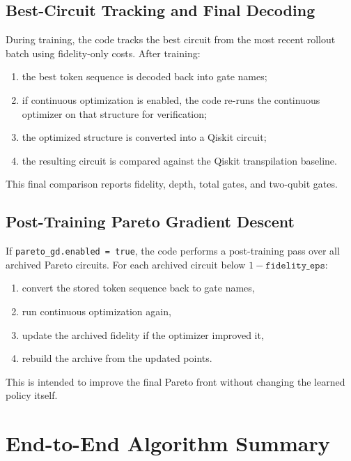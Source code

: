 \documentclass[11pt]{article}
\begin{document}
\subsection{Best-Circuit Tracking and Final Decoding}

During training, the code tracks the best circuit from the most recent rollout batch using fidelity-only costs. After training:

\begin{enumerate}[leftmargin=*]
\item the best token sequence is decoded back into gate names;
\item if continuous optimization is enabled, the code re-runs the continuous optimizer on that structure for verification;
\item the optimized structure is converted into a Qiskit circuit;
\item the resulting circuit is compared against the Qiskit transpilation baseline.
\end{enumerate}

This final comparison reports fidelity, depth, total gates, and two-qubit gates.

\subsection{Post-Training Pareto Gradient Descent}

If \texttt{pareto\_gd.enabled = true}, the code performs a post-training pass over all archived Pareto circuits. For each archived circuit below $1 - \texttt{fidelity\_eps}$:

\begin{enumerate}[leftmargin=*]
\item convert the stored token sequence back to gate names,
\item run continuous optimization again,
\item update the archived fidelity if the optimizer improved it,
\item rebuild the archive from the updated points.
\end{enumerate}

This is intended to improve the final Pareto front without changing the learned policy itself.

\section{End-to-End Algorithm Summary}
\end{document}
